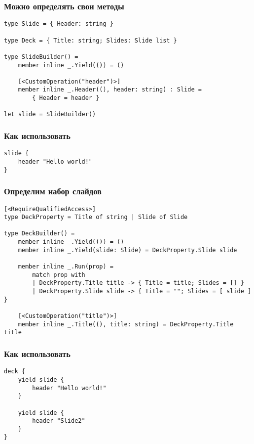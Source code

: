 \documentclass{../../slides-style}
\begin{document}
    \begin{frame}[fragile]
        \frametitle{Можно определять свои методы}
        \begin{verbatim}
type Slide = { Header: string }

type Deck = { Title: string; Slides: Slide list }

type SlideBuilder() =
    member inline _.Yield(()) = ()

    [<CustomOperation("header")>]
    member inline _.Header((), header: string) : Slide = 
        { Header = header }

let slide = SlideBuilder()
        \end{verbatim}
    \end{frame}

    \begin{frame}[fragile]
        \frametitle{Как использовать}
        \begin{verbatim}
slide {
    header "Hello world!"
}
        \end{verbatim}
    \end{frame}

    \begin{frame}[fragile]
        \frametitle{Определим набор слайдов}
        \begin{verbatim}
[<RequireQualifiedAccess>]
type DeckProperty = Title of string | Slide of Slide

type DeckBuilder() =
    member inline _.Yield(()) = ()
    member inline _.Yield(slide: Slide) = DeckProperty.Slide slide

    member inline _.Run(prop) =
        match prop with
        | DeckProperty.Title title -> { Title = title; Slides = [] }
        | DeckProperty.Slide slide -> { Title = ""; Slides = [ slide ] }

    [<CustomOperation("title")>]
    member inline _.Title((), title: string) = DeckProperty.Title title
        \end{verbatim}
    \end{frame}

    \begin{frame}[fragile]
        \frametitle{Как использовать}
        \begin{verbatim}
deck {
    yield slide {
        header "Hello world!"
    }

    yield slide {
        header "Slide2"
    }
}

        \end{verbatim}
    \end{frame}
\end{document}

